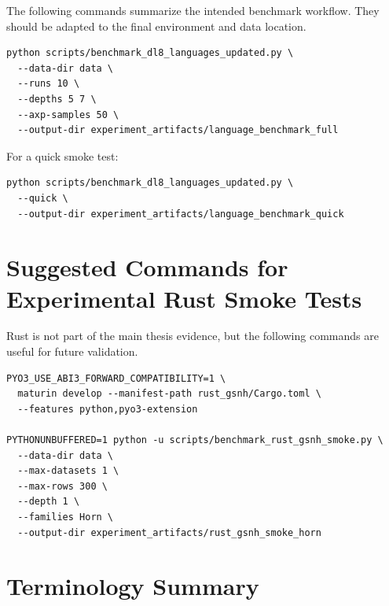 \documentclass[11pt,a4paper]{article}
\begin{document}
The following commands summarize the intended benchmark workflow. They should be adapted to the final environment and data location.

\begin{verbatim}
python scripts/benchmark_dl8_languages_updated.py \
  --data-dir data \
  --runs 10 \
  --depths 5 7 \
  --axp-samples 50 \
  --output-dir experiment_artifacts/language_benchmark_full
\end{verbatim}

For a quick smoke test:

\begin{verbatim}
python scripts/benchmark_dl8_languages_updated.py \
  --quick \
  --output-dir experiment_artifacts/language_benchmark_quick
\end{verbatim}

\section{Suggested Commands for Experimental Rust Smoke Tests}

Rust is not part of the main thesis evidence, but the following commands are useful for future validation.

\begin{verbatim}
PYO3_USE_ABI3_FORWARD_COMPATIBILITY=1 \
  maturin develop --manifest-path rust_gsnh/Cargo.toml \
  --features python,pyo3-extension

PYTHONUNBUFFERED=1 python -u scripts/benchmark_rust_gsnh_smoke.py \
  --data-dir data \
  --max-datasets 1 \
  --max-rows 300 \
  --depth 1 \
  --families Horn \
  --output-dir experiment_artifacts/rust_gsnh_smoke_horn
\end{verbatim}

\section{Terminology Summary}
\end{document}
